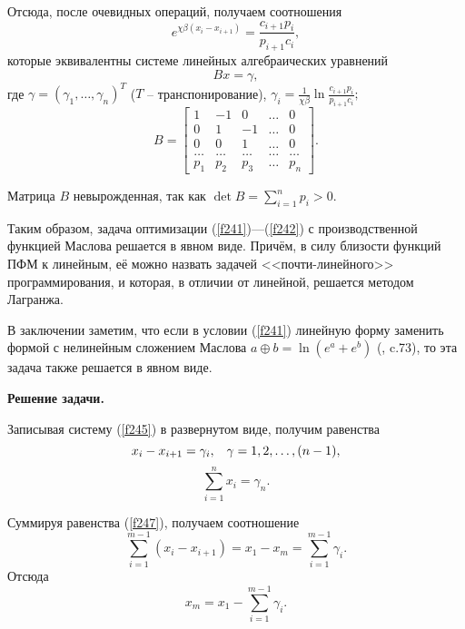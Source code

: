 \documentclass[12pt,openbib]{report}
\begin{document}
Отсюда, после очевидных операций, получаем соотношения
\begin{equation}\label{f244}
e^{\chi \beta (x_i-x_{i+1})}=\frac{c_{i+1}p_i}{p_{i+1}c_i}, %
\end{equation}
 которые эквивалентны системе линейных алгебраических уравнений
 \begin{equation}\label{f245}
 Bx=\gamma, %
 \end{equation}
 где $\gamma = (\gamma_1, \ldots, \gamma_n)^T$ ($T$ -- транспонирование), $\gamma_i=\frac1{\chi\beta}\ln\frac{c_{i+1}p_i}{p_{i+1}c_i};$
 \begin{equation}\label{f246}
 B=\left[\begin{array}{ccccc}
 1 & -1 & 0 & \ldots & 0\\
 0 & 1 & -1 & \ldots & 0\\
 0 & 0 & 1 & \ldots & 0\\
 \ldots & \ldots & \ldots & \ldots & \ldots \\
 p_1 & p_2 & p_3 & \ldots & p_n
 \end{array}
 \right].
 \end{equation}

Матрица $B$ невырожденная, так как $\det B=\sum\limits^n_{i=1} p_i>0$.

Таким образом, задача оптимизации (\ref{f241})---(\ref{f242}) с производственной функцией Маслова решается в явном виде. Причём, в силу близости
функций ПФМ к линейным, её можно назвать задачей <<почти-линейного>>
программирования, и которая, в отличии от линейной, решается методом
Лагранжа.

В заключении заметим, что если в условии (\ref{f241}) линейную форму
заменить формой с нелинейным сложением Маслова $a\oplus b =\ln
(e^a+e^b)$ (\cite{MaslovKvant}, c.73), то эта задача также решается в явном виде.

{\bf Решение задачи.}

Записывая систему (\ref{f245}) в развернутом виде, получим равенства
\begin{equation}\label{f247}
x_i-x_{i+1}=\gamma_i,\hspace{3mm}\gamma=1,2,\dots,(n-1),
\end{equation}
\begin{equation}\label{f248}
\sum_{i=1}^nx_i=\gamma_n.
\end{equation}

Суммируя равенства (\ref{f247}), получаем соотношение
\begin{equation}\label{f249}
\sum_{i=1}^{m-1}(x_i-x_{i+1})=x_1-x_m=\sum_{i=1}^{m-1}\gamma_i.
\end{equation}
Отсюда
\begin{equation}\label{f2410}
x_m=x_1-\sum_{i=1}^{m-1}\gamma_i.
\end{equation}
\end{document}
